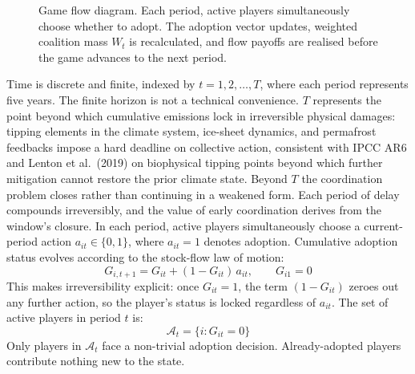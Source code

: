 \documentclass[10pt,a4paper]{article}
\begin{document}
\begin{figure}[htbp]
\centering
{}
\caption{Game flow diagram. Each period, active players simultaneously choose whether to adopt.
The adoption vector updates, weighted coalition mass $W_t$ is recalculated, and flow payoffs
are realised before the game advances to the next period.}
\label{fig:game_flow}
\end{figure}

Time is discrete and finite, indexed by $t = 1, 2, \ldots, T$, where each period represents
five years. The finite horizon is not a technical convenience. $T$ represents the point beyond which cumulative emissions lock in irreversible physical damages: tipping elements in the climate system, ice-sheet dynamics, and permafrost feedbacks impose a hard deadline on collective action, consistent with IPCC AR6 and Lenton et al.\ (2019) on biophysical tipping points beyond which further mitigation cannot restore the prior climate state. Beyond $T$ the coordination problem closes rather than continuing in a weakened form. Each period of delay compounds irreversibly, and the value of early coordination derives from the window's closure. In each period, active
players simultaneously choose a current-period action $a_{it} \in \{0, 1\}$, where $a_{it} = 1$
denotes adoption. Cumulative adoption status evolves according to the stock-flow law of motion:
\[
G_{i,t+1} = G_{it} + (1 - G_{it})\, a_{it}, \qquad G_{i1} = 0
\]
This makes irreversibility explicit: once $G_{it} = 1$, the term $(1 - G_{it})$ zeroes out any
further action, so the player's status is locked regardless of $a_{it}$. The set of active
players in period $t$ is:
\[
\mathcal{A}_t = \{i : G_{it} = 0\}
\]
Only players in $\mathcal{A}_t$ face a non-trivial adoption decision. Already-adopted players
contribute nothing new to the state.
\end{document}
